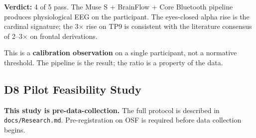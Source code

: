 \noindent\textbf{Verdict:} 4 of 5 pass. The Muse S + BrainFlow + Core Bluetooth
pipeline produces physiological EEG on the participant. The eyes-closed
alpha rise is the cardinal signature; the 3$\times$ rise on TP9 is
consistent with the literature consensus of 2--3$\times$ on frontal
derivations.

This is a \textbf{calibration observation} on a single participant, not a
normative threshold. The pipeline is the result; the ratio is a property
of the data.

\subsection{D8 Pilot Feasibility Study}

%

\textbf{This study is pre-data-collection.} The full protocol is described
in \texttt{docs/Research.md}. Pre-registration on OSF is required before
data collection begins.
